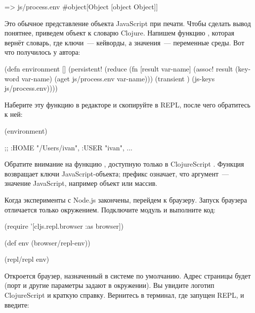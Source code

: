 \begin{english}
  \begin{clojure}
=> js/process.env
#object[Object [object Object]]
  \end{clojure}
\end{english}

Это обычное представление объекта JavaScript при печати. Чтобы сделать вывод понятнее, приведем объект к словарю Clojure. Напишем функцию , которая вернёт словарь, где ключи~--- кейворды, а значения~--- переменные среды. Вот что получилось у автора:

\begin{english}
  \begin{clojure/lines}
(defn environment []
  (persistent!
   (reduce
    (fn [result var-name]
      (assoc! result
              (keyword var-name)
              (aget js/process.env var-name)))
    (transient {})
    (js-keys js/process.env))))
  \end{clojure/lines}
\end{english}

Наберите эту функцию в редакторе и скопируйте в REPL, после чего обратитесь к ней:

\begin{english}
  \begin{clojure}
(environment)

;; {:HOME "/Users/ivan", :USER "ivan", ...}
  \end{clojure}
\end{english}

Обратите внимание на функцию , доступную только в ClojureScript . Функция возвращает ключи JavaScript-объекта; префикс  означает, что аргумент~--- значение JavaScript, например объект или массив.

Когда эксперименты с Node.js закончены, перейдем к браузеру. Запуск браузера отличается только окружением. Подключите модуль  и выполните код:

\begin{english}
  \begin{clojure}
(require '[cljs.repl.browser :as browser])

(def env (browser/repl-env))

(repl/repl env)
  \end{clojure}
\end{english}

Откроется браузер, назначенный в системе по умолчанию. Адрес страницы будет  (порт и другие параметры задают в окружении). Вы увидите логотип ClojureScript и краткую справку. Вернитесь в терминал, где запущен REPL, и введите:

